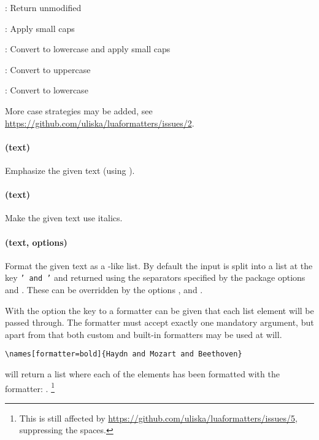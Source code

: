 \documentclass[12pt]{scrartcl}
\begin{document}
\begin{itemize*}
\item {}: Return unmodified
\item {}: Apply small caps
\item {}: Convert to lowercase and apply small caps
\item {}: Convert to uppercase
\item {}: Convert to lowercase
\end{itemize*}

\noindent More case strategies may be added, see
\url{https://github.com/uliska/luaformatters/issues/2}.

\paragraph{ (text)}

Emphasize the given text (using ).

\paragraph{ (text)}

Make the given text use italics.

\paragraph{ (text, options)}

Format the given text as a -like list.  By default the input
is split into a list at the key \texttt{' and '} and returned using the
separators specified by the package options  and
.  These can be overridden by the options
,  and .

With the option  the key to a formatter can be given that each
list element will be passed through.  The formatter must accept exactly one
mandatory argument, but apart from that both custom and built-in formatters may
be used at will.

\begin{verbatim}
\names[formatter=bold]{Haydn and Mozart and Beethoven}
\end{verbatim}

\noindent will return a list where each of the elements has been formatted with
the  formatter: .%
\footnote{This is still affected by
\url{https://github.com/uliska/luaformatters/issues/5}, suppressing the spaces.}
\end{document}
